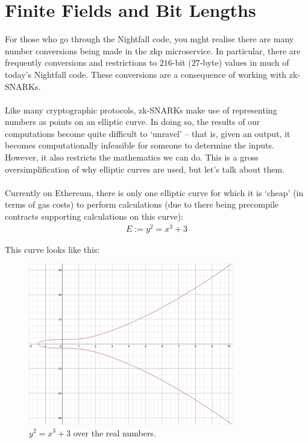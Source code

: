 \section{Finite Fields and Bit Lengths}
\label{sec:finiteFieldsAndBitLengths}

\noindent
For those who go through the Nightfall code, you mght realise there are many number conversions being made in the zkp microservice. In particular, there are frequently conversions and restrictions to $216$-bit ($27$-byte) values in much of today's Nightfall code. These conversions are a consequence of working with zk-SNARKs.\\
\\
Like many cryptographic protocols, zk-SNARKs make use of representing numbers as points on an elliptic curve. In doing so, the results of our computations become quite difficult to `unravel' -- that is, given an output, it becomes computationally infeasible for someone to determine the inputs. However, it also restricts the mathematics we can do. This is a gross oversimplification of why elliptic curves are used, but let's talk about them.\\
\\
Currently on Ethereum, there is only one elliptic curve for which it is `cheap' (in terms of gas costs) to perform calculations (due to there being precompile contracts supporting calculations on this curve):
\begin{align*}
    E := y^2 = x^3 + 3
\end{align*}

This curve looks like this:
\begin{figure}[H]
	\begin{center}
		\includegraphics[width=0.8\textwidth]{images/ellipticCurveReals.png}
	\end{center}
	\caption{$y^2 = x^3 + 3$ over the real numbers.}
	\label{pic:ftShield}
\end{figure}

